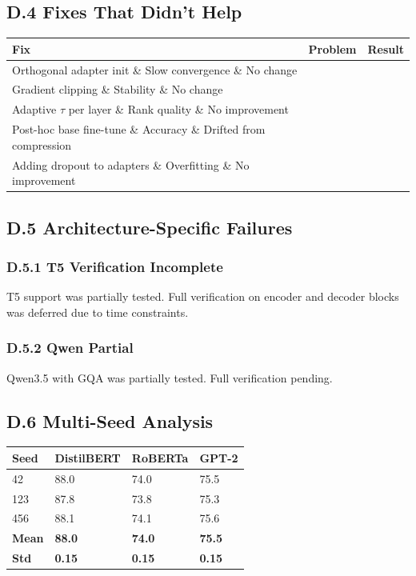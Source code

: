 \subsection{D.4 Fixes That Didn't Help}

\begin{table}[H]
\centering
\small
\begin{tabular}{lll}
\toprule
\textbf{Fix} & \textbf{Problem} & \textbf{Result} \\
\midrule
Orthogonal adapter init \& Slow convergence \& No change \\
Gradient clipping \& Stability \& No change \\
Adaptive $\tau$ per layer \& Rank quality \& No improvement \\
Post-hoc base fine-tune \& Accuracy \& Drifted from compression \\
Adding dropout to adapters \& Overfitting \& No improvement \\
\bottomrule
\end{tabular}
\end{table}

\subsection{D.5 Architecture-Specific Failures}

\subsubsection{D.5.1 T5 Verification Incomplete}

T5 support was partially tested. Full verification on encoder and decoder 
blocks was deferred due to time constraints.

\subsubsection{D.5.2 Qwen Partial}

Qwen3.5 with GQA was partially tested. Full verification pending.

\subsection{D.6 Multi-Seed Analysis}

\begin{table}[H]
\centering
\small
\begin{tabular}{llll}
\toprule
\textbf{Seed} & \textbf{DistilBERT} & \textbf{RoBERTa} & \textbf{GPT-2} \\
\midrule
42 & 88.0 & 74.0 & 75.5 \\
123 & 87.8 & 73.8 & 75.3 \\
456 & 88.1 & 74.1 & 75.6 \\
\textbf{Mean} & \textbf{88.0} & \textbf{74.0} & \textbf{75.5} \\
\textbf{Std} & \textbf{0.15} & \textbf{0.15} & \textbf{0.15} \\
\bottomrule
\end{tabular}
\end{table}

